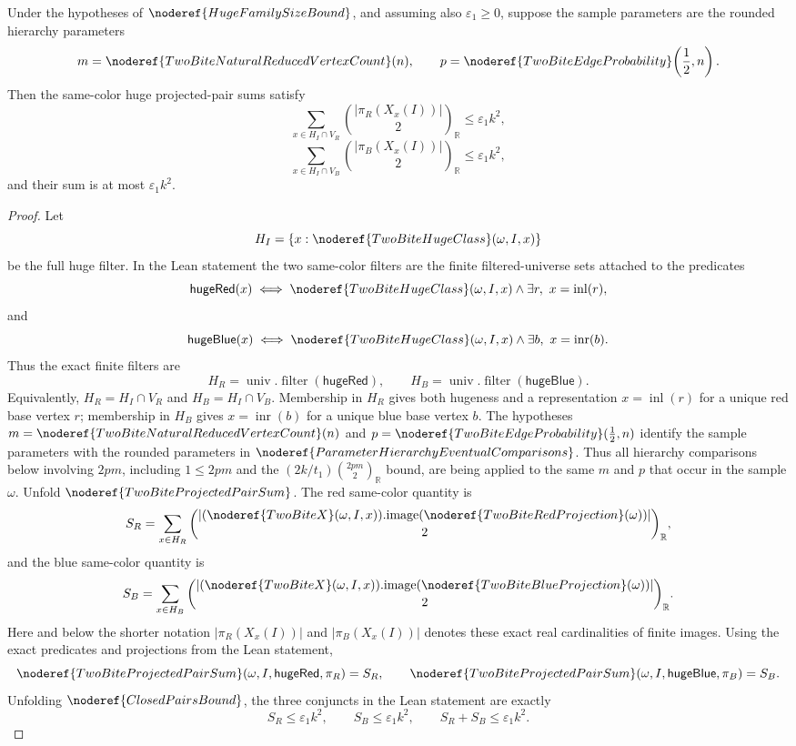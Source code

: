 \begin{lemma}
Under the hypotheses of \(\noderef{HugeFamilySizeBound}\), and assuming also
\(\varepsilon_1\ge0\), suppose the sample parameters are the rounded hierarchy
parameters
\[
m=\noderef{TwoBiteNaturalReducedVertexCount}(n),
\qquad
p=\noderef{TwoBiteEdgeProbability}\!\left(\frac12,n\right).
\]
Then the same-color huge projected-pair sums satisfy
\[
\sum_{x\in H_I\cap V_R}\binom{|\pi_R(X_x(I))|}{2}_{\mathbb R}
\le\varepsilon_1k^2,
\]
\[
\sum_{x\in H_I\cap V_B}\binom{|\pi_B(X_x(I))|}{2}_{\mathbb R}
\le\varepsilon_1k^2,
\]
and their sum is at most \(\varepsilon_1k^2\).
\end{lemma}
\begin{proof}
Let
\[
H_I=\{x:\noderef{TwoBiteHugeClass}(\omega,I,x)\}
\]
be the full huge filter.  In the Lean statement the two same-color filters are
the finite filtered-universe sets attached to the predicates
\[
\mathsf{hugeRed}(x)\iff
\noderef{TwoBiteHugeClass}(\omega,I,x)\wedge
  \exists r,\ x=\operatorname{inl}(r),
\]
and
\[
\mathsf{hugeBlue}(x)\iff
\noderef{TwoBiteHugeClass}(\omega,I,x)\wedge
  \exists b,\ x=\operatorname{inr}(b).
\]
Thus the exact finite filters are
\[
H_R=\operatorname{univ}.\operatorname{filter}(\mathsf{hugeRed}),
\qquad
H_B=\operatorname{univ}.\operatorname{filter}(\mathsf{hugeBlue}).
\]
Equivalently, \(H_R=H_I\cap V_R\) and \(H_B=H_I\cap V_B\).  Membership in
\(H_R\) gives both hugeness and a representation \(x=\operatorname{inl}(r)\)
for a unique red base vertex \(r\); membership in \(H_B\) gives
\(x=\operatorname{inr}(b)\) for a unique blue base vertex \(b\).
The hypotheses \(m=\noderef{TwoBiteNaturalReducedVertexCount}(n)\) and
\(p=\noderef{TwoBiteEdgeProbability}(\frac12,n)\) identify the sample
parameters with the rounded parameters in
\(\noderef{ParameterHierarchyEventualComparisons}\).  Thus all hierarchy
comparisons below involving \(2pm\), including \(1\le 2pm\) and the
\((2k/t_1)\binom{2pm}{2}_{\mathbb R}\) bound, are being applied to the same
\(m\) and \(p\) that occur in the sample \(\omega\).
Unfold \(\noderef{TwoBiteProjectedPairSum}\).  The red same-color quantity is
\[
S_R=\sum_{x\in H_R}
  \binom{
    |(\noderef{TwoBiteX}(\omega,I,x)).\mathrm{image}
      (\noderef{TwoBiteRedProjection}(\omega))|
  }{2}_{\mathbb R},
\]
and the blue same-color quantity is
\[
S_B=\sum_{x\in H_B}
  \binom{
    |(\noderef{TwoBiteX}(\omega,I,x)).\mathrm{image}
      (\noderef{TwoBiteBlueProjection}(\omega))|
  }{2}_{\mathbb R}.
\]
Here and below the shorter notation \(|\pi_R(X_x(I))|\) and
\(|\pi_B(X_x(I))|\) denotes these exact real cardinalities of finite images.
Using the exact predicates and projections from the Lean statement,
\[
\noderef{TwoBiteProjectedPairSum}(\omega,I,\mathsf{hugeRed},\pi_R)=S_R,
\qquad
\noderef{TwoBiteProjectedPairSum}(\omega,I,\mathsf{hugeBlue},\pi_B)=S_B.
\]
Unfolding \(\noderef{ClosedPairsBound}\), the three conjuncts in the Lean
statement are exactly
\[
S_R\le\varepsilon_1k^2,\qquad
S_B\le\varepsilon_1k^2,\qquad
S_R+S_B\le\varepsilon_1k^2.
\]


\end{proof}
